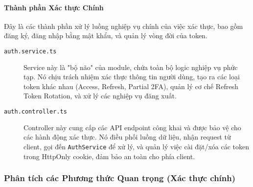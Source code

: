 \paragraph{Thành phần Xác thực Chính}
Đây là các thành phần xử lý luồng nghiệp vụ chính của việc xác thực, bao gồm đăng ký, đăng nhập bằng mật khẩu, và quản lý vòng đời của token.
\begin{description}
    \item[\texttt{auth.service.ts}] Service này là "bộ não" của module, chứa toàn bộ logic nghiệp vụ phức tạp. Nó chịu trách nhiệm xác thực thông tin người dùng, tạo ra các loại token khác nhau (Access, Refresh, Partial 2FA), quản lý cơ chế Refresh Token Rotation, và xử lý các nghiệp vụ đăng xuất.
    
    \item[\texttt{auth.controller.ts}] Controller này cung cấp các API endpoint công khai và được bảo vệ cho các hành động xác thực. Nó điều phối luồng dữ liệu, nhận request từ client, gọi đến \texttt{AuthService} để xử lý, và quản lý việc cài đặt/xóa các token trong HttpOnly cookie, đảm bảo an toàn cho phía client.
\end{description}

\subsubsection{Phân tích các Phương thức Quan trọng (Xác thực chính)}

